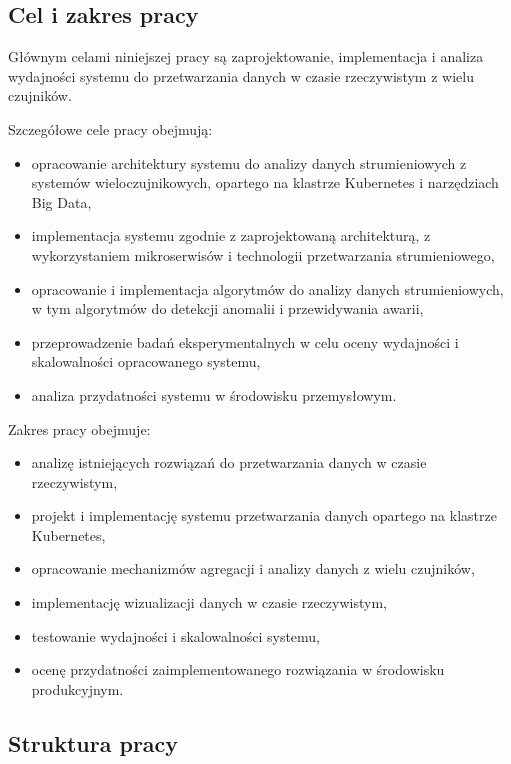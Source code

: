 \subsection{Cel i zakres pracy}
\label{subsec:cel}

Głównym celami niniejszej pracy są zaprojektowanie, implementacja i analiza wydajności systemu do przetwarzania danych w
czasie rzeczywistym z wielu czujników.

Szczegółowe cele pracy obejmują:
\begin{itemize}
    \item opracowanie architektury systemu do analizy danych strumieniowych z systemów wieloczujnikowych, opartego na klastrze Kubernetes i narzędziach Big Data,
    \item implementacja systemu zgodnie z zaprojektowaną architekturą, z wykorzystaniem mikroserwisów i technologii przetwarzania strumieniowego,
    \item opracowanie i implementacja algorytmów do analizy danych strumieniowych, w tym algorytmów do detekcji anomalii i przewidywania awarii,
    \item przeprowadzenie badań eksperymentalnych w celu oceny wydajności i skalowalności opracowanego systemu,
    \item analiza przydatności systemu w środowisku przemysłowym.
\end{itemize}

Zakres pracy obejmuje:
\begin{itemize}
    \item analizę istniejących rozwiązań do przetwarzania danych w czasie rzeczywistym,
    \item projekt i implementację systemu przetwarzania danych opartego na klastrze Kubernetes,
    \item opracowanie mechanizmów agregacji i analizy danych z wielu czujników,
    \item implementację wizualizacji danych w czasie rzeczywistym,
    \item testowanie wydajności i skalowalności systemu,
    \item ocenę przydatności zaimplementowanego rozwiązania w środowisku produkcyjnym.
\end{itemize}

\subsection{Struktura pracy}
\label{subsec:struktura}

